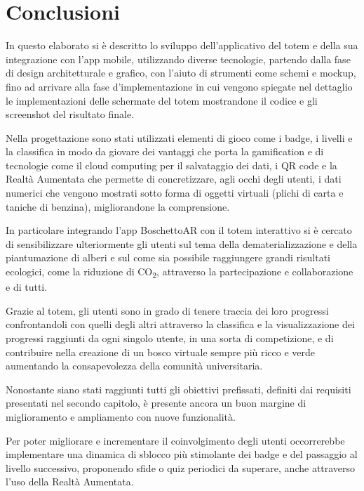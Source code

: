 \chapter{Conclusioni}

In questo elaborato si è descritto lo sviluppo dell'applicativo del totem e della sua integrazione con l'app mobile, utilizzando diverse tecnologie, partendo dalla fase di design architetturale e grafico, con l'aiuto di strumenti come schemi e mockup, fino ad arrivare alla fase d'implementazione in cui vengono spiegate nel dettaglio le implementazioni delle schermate del totem mostrandone il codice e gli screenshot del risultato finale.

Nella progettazione sono stati utilizzati elementi di gioco come i badge, i livelli e la classifica in modo da giovare dei vantaggi che porta la gamification e di tecnologie come il cloud computing per il salvataggio dei dati, i QR code e la Realtà Aumentata che permette di concretizzare, agli occhi degli utenti, i dati numerici che vengono mostrati sotto forma di oggetti virtuali (plichi di carta e taniche di benzina), migliorandone la comprensione.

In particolare integrando l'app BoschettoAR con il totem interattivo si è cercato di sensibilizzare ulteriormente gli utenti sul tema della dematerializzazione e della piantumazione di alberi e sul come sia possibile raggiungere grandi risultati ecologici, come la riduzione di CO\textsubscript{2}, attraverso la partecipazione e collaborazione e di tutti.

Grazie al totem, gli utenti sono in grado di tenere traccia dei loro progressi confrontandoli con quelli degli altri attraverso la classifica e la visualizzazione dei progressi raggiunti da ogni singolo utente, in una sorta di competizione, e di contribuire nella creazione di un bosco virtuale sempre più ricco e verde aumentando la consapevolezza della comunità universitaria.

Nonostante siano stati raggiunti tutti gli obiettivi prefissati, definiti dai requisiti presentati nel secondo capitolo, è presente ancora un buon margine di miglioramento e ampliamento con nuove funzionalità.

Per poter migliorare e incrementare il coinvolgimento degli utenti occorrerebbe implementare una dinamica di sblocco più stimolante dei badge e del passaggio al livello successivo, proponendo sfide o quiz periodici da superare, anche attraverso l'uso della Realtà Aumentata.

